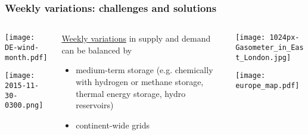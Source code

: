 \documentclass[10pt,aspectratio=169,dvipsnames]{beamer}
\let\olditem\item
\renewcommand{\item}{%
\olditem\vspace{5pt}}
\begin{document}
\begin{frame}
  \frametitle{Weekly variations: challenges and solutions}

  \begin{columns}[T]
    \begin{column}{5cm}
      \texttt{[image: DE-wind-month.pdf]}

      \texttt{[image: 2015-11-30-0300.png]}

    \end{column}
    \begin{column}{4cm}
      \href{https://www.youtube.com/watch?v=ttfuEnMz2UM}{\alert{Weekly} variations} in supply and demand can be balanced by
      \begin{itemize}
      \item \alert{medium-term storage} (e.g. chemically with hydrogen or methane storage, thermal energy storage, hydro reservoirs)
      \item \alert{continent-wide grids}
      \end{itemize}

    \end{column}
    \begin{column}{5cm}
      \texttt{[image: 1024px-Gasometer\_in\_East\_London.jpg]}

      \texttt{[image: europe\_map.pdf]}
    \end{column}
  \end{columns}

\end{frame}
\end{document}
